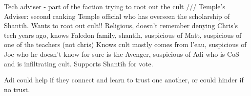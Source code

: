 \documentclass[char]{GL2020}
\begin{document}
\name{\cAntiChup{}}










Tech adviser - part of the faction trying to root out the cult /// 
Temple's Adviser: second ranking Temple official who has overseen the scholarship of Shantih.  Wants to root out cult!! 	Religious, doesn't remember denying Chris's tech years ago, knows Faledon family, shantih, suspicious of Matt, suspicious of one of the teachers (not chris) Knows cult mostly comes from l'eau, suspicious of Joe who he doesn't know for sure is the Avenger, suspicious of Adi who is CoS and is infiltrating cult.  Supports Shantih for vote.

Adi could help if they connect and learn to trust one another, or could hinder if no trust.
\end{document}
